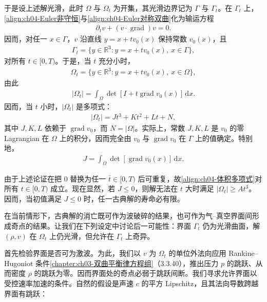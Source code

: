 ﻿\documentclass[../../main.tex]{subfiles}
\begin{document}
于是设上述解光滑，此时 $\Omega$ 与 $\Omega_{t}$ 为开集，其光滑边界记为 $\Gamma$ 与 $\Gamma_{t}$。在 $\Gamma_{t}$ 上，\eqref{align:ch04-Euler非守恒}与\eqref{align:ch04-Euler对称双曲}化为输运方程
\begin{align}
\partial_{t}v+(v\cdot\operatorname{grad})v=0.
\label{align:ch04-界面输运}
\end{align}
因而，对任一 $x\in\Gamma$，$v$ 沿直线 $y=x+tv_{0}(x)$ 保持常数 $v_{0}(x)$，且
\begin{align}
\Gamma_{t}=\{y\in\mathbb{R}^{3}:y=x+tv_{0}(x),\ x\in\Gamma\},
\label{align:ch04-界面Gamma_t}
\end{align}
对所有 $t\in[0,T)$。于是，当 $t$ 充分小时，
\begin{align}
\Omega_{t}=\{y\in\mathbb{R}^{3}:y=x+tv_{0}(x),\ x\in\Omega\},
\label{align:ch04-Omega_t}
\end{align}
由此
\begin{align}
|\Omega_{t}|=\int_{\Omega}\det[I+t\operatorname{grad}v_{0}(x)]\,\mathrm{d}x.
\label{align:ch04-体积积分}
\end{align}
因而，当 $t$ 小时，$|\Omega_{t}|$ 是多项式：
\begin{align}
|\Omega_{t}|=Jt^{3}+Kt^{2}+Lt+N,
\label{align:ch04-体积多项式}
\end{align}
其中 $J,K,L$ 依赖于 $\operatorname{grad}v_{0}$，而 $N=|\Omega|$。实际上，常数 $J,K,L$ 是 $v_{0}$ 的零 Lagrangian 在 $\Omega$ 上的积分，因而完全由 $v_{0}$ 与 $\operatorname{grad}v_{0}$ 在 $\Gamma$ 上的值确定。特别地，
\begin{align}
J=\int_{\Omega}\det[\operatorname{grad}v_{0}(x)]\,\mathrm{d}x.
\label{align:ch04-J}
\end{align}

由于上述论证在把 $0$ 替换为任一 $\bar{t}\in[0,T)$ 后可重复，故\eqref{align:ch04-体积多项式}对所有 $t\in[0,T)$ 成立。现在显然，若 $J\leqslant 0$，则解无法在 $t$ 大时满足 $|\Omega_{t}|\geqslant At^{3}$。因而，当初值满足 $J\leqslant 0$ 时，任一古典解的寿命必有限。

在当前情形下，古典解的消亡既可作为波破碎的结果，也可作为气--真空界面间形成奇点的结果。让我们在下列设定中讨论后一可能性：界面 $\Gamma_{t}$ 仍为光滑曲面，解 $(\rho,v)$ 在 $\Omega_{t}$ 上仍光滑，但允许在 $\Gamma_{t}$ 上奇异。

首先检验界面是否可为激波。为此，我们以 $v$ 为 $\Omega_{t}$ 的单位外法向应用 Rankine--Hugoniot 条件\cref{chapter:ch03-双曲平衡律方程组}（3.3.40），推出压力 $p$ 的跳跃、从而密度 $\rho$ 的跳跃为零。因而界面处的奇点必弱于跳跃间断。我们寻求允许界面以受控速率加速的条件。自然的假设是声速 $c$ 的平方 Lipschitz，且其法向导数跨越界面有跳跃：
\end{document}
